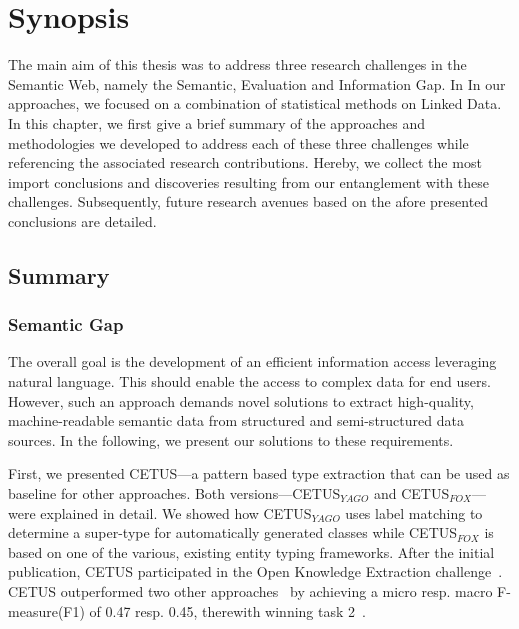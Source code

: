 \chapter{Synopsis}





The main aim of this thesis was to address three research challenges in the Semantic Web, namely the Semantic, Evaluation and Information Gap. In In our approaches, we focused on a combination of statistical methods on Linked Data. 
In this chapter, we first give a brief summary of the approaches and methodologies we developed to address each of these three challenges while referencing the associated research contributions.
Hereby, we collect the most import conclusions and discoveries resulting from our entanglement with these challenges.
Subsequently, future research avenues based on the afore presented conclusions are detailed.
 
\section{Summary}
\subsection*{Semantic Gap}

The overall goal is the development of an efficient information access leveraging natural language.
This should enable the access to complex data for end users.
However, such an approach demands novel solutions to extract high-quality, machine-readable semantic data from structured and semi-structured data sources. 
In the following, we present our solutions to these requirements.

First, we presented CETUS---a pattern based type extraction that can be used as baseline for other approaches.
Both versions---CETUS$_{YAGO}$ and CETUS$_{FOX}$---were explained in detail.
We showed how CETUS$_{YAGO}$ uses label matching to determine a super-type for automatically generated classes while CETUS$_{FOX}$ is based on one of the various, existing entity typing frameworks.
After the initial publication, CETUS participated in the Open Knowledge Extraction challenge~\cite{okechallenge}.
CETUS outperformed two other approaches~\cite{fred_typing,oak_sheffield} by achieving a  micro resp. macro F-measure(F1) of 0.47 resp. 0.45, therewith winning task 2~\cite{okechallenge}.	

